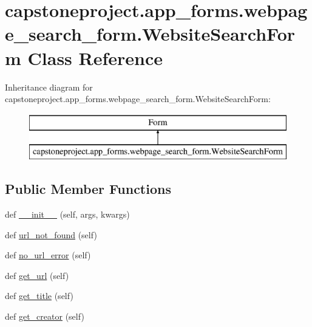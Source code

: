 \hypertarget{classcapstoneproject_1_1app__forms_1_1webpage__search__form_1_1_website_search_form}{}\section{capstoneproject.\+app\+\_\+forms.\+webpage\+\_\+search\+\_\+form.\+Website\+Search\+Form Class Reference}
\label{classcapstoneproject_1_1app__forms_1_1webpage__search__form_1_1_website_search_form}
Inheritance diagram for capstoneproject.\+app\+\_\+forms.\+webpage\+\_\+search\+\_\+form.\+Website\+Search\+Form\+:\begin{figure}[H]
\begin{center}
\leavevmode
\includegraphics[height=2.000000cm]{classcapstoneproject_1_1app__forms_1_1webpage__search__form_1_1_website_search_form}
\end{center}
\end{figure}
\subsection*{Public Member Functions}
\begin{DoxyCompactItemize}
\item 
def \mbox{\hyperlink{classcapstoneproject_1_1app__forms_1_1webpage__search__form_1_1_website_search_form_a8097ece1be6e89333c660b5355ef3799}{\+\_\+\+\_\+init\+\_\+\+\_\+}} (self, args, kwargs)
\item 
def \mbox{\hyperlink{classcapstoneproject_1_1app__forms_1_1webpage__search__form_1_1_website_search_form_a249f5337370608e6e4c69f5ded772c5d}{url\+\_\+not\+\_\+found}} (self)
\item 
def \mbox{\hyperlink{classcapstoneproject_1_1app__forms_1_1webpage__search__form_1_1_website_search_form_af47feb5cba4673256c86c0ad2691b142}{no\+\_\+url\+\_\+error}} (self)
\item 
def \mbox{\hyperlink{classcapstoneproject_1_1app__forms_1_1webpage__search__form_1_1_website_search_form_a7156a7c06a66ea31df405780d0712791}{get\+\_\+url}} (self)
\item 
def \mbox{\hyperlink{classcapstoneproject_1_1app__forms_1_1webpage__search__form_1_1_website_search_form_ae1ab2115f5ce8a6cfdc8b6bcc9d41ce1}{get\+\_\+title}} (self)
\item 
def \mbox{\hyperlink{classcapstoneproject_1_1app__forms_1_1webpage__search__form_1_1_website_search_form_a1e0e8f20635cfd5a52f4517e68a3d4bb}{get\+\_\+creator}} (self)
\end{DoxyCompactItemize}
